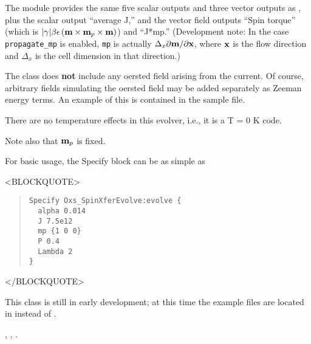 \begin{description}
The  module provides the same five scalar
outputs and three vector outputs as , plus the
scalar output ``average J,'' and the vector field outputs ``Spin
torque'' (which is
$|\gamma|\beta\epsilon\left(\textbf{m}\times\textbf{m}_p\times\textbf{m}\right)$) and
``J*mp.''  (Development note: In the case \texttt{propagate\_mp} is
enabled, \texttt{mp} is actually $\Delta_x\partial\textbf{m}/\partial\textbf{x}$,
where $\textbf{x}$ is the flow direction and $\Delta_x$ is the cell dimension
in that direction.)

The  class does \textbf{not} include any oersted
field arising from the current.  Of course, arbitrary fields simulating
the oersted field may be added separately as Zeeman energy terms.  An
example of this is contained in the  sample file.

There are no temperature effects in this evolver, i.e., it is a T = 0 K
code.

Note also that $\textbf{m}_p$ is fixed.

For basic usage, the Specify block can be as simple as
\begin{rawhtml}
<BLOCKQUOTE>
\end{rawhtml}
\begin{quote}
\begin{verbatim}
Specify Oxs_SpinXferEvolve:evolve {
  alpha 0.014
  J 7.5e12
  mp {1 0 0}
  P 0.4
  Lambda 2
}
\end{verbatim}
\end{quote}
\begin{rawhtml}
</BLOCKQUOTE>
\end{rawhtml}

This class is still in early development; at this time the example files
are located in  instead of
.

\begin{ExampleMifs}
  , , .
\end{ExampleMifs}


\end{description}
